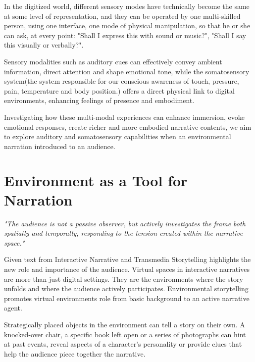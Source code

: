     In the digitized world, different sensory modes have technically become the same at some level of representation, and they can be operated by one multi-skilled person, using one interface, one mode of physical manipulation, so that he or she can ask, at every point: "Shall I express this with sound or music?", "Shall I say this visually or verbally?"\cite{Multimodal_Discourse}.\par

    Sensory modalities such as auditory cues can effectively convey ambient information, direct attention and shape emotional tone, while the somatosensory system(the system responsible for our conscious awareness of touch, pressure, pain, temperature and body position\cite{Somatic_Sensory}.) offers a direct physical link to digital environments, enhancing feelings of presence and embodiment.\par

    Investigating how these multi-modal experiences can enhance immersion, evoke emotional responses, create richer and more embodied narrative contents, we aim to explore auditory and somatosensory capabilities when an environmental narration introduced to an audience.\par
    \section{Environment as a Tool for Narration} 
    \emph{"The audience is not a passive observer, but actively investigates the frame both spatially and temporally, responding to the tension created within the narrative space\cite{Transmedia_Storytelling}."}

    Given text from Interactive Narrative and Transmedia Storytelling highlights the new role and importance of the audience. Virtual spaces in interactive narratives are more than just digital settings. They are the environments where the story unfolds and where the audience actively participates. Environmental storytelling promotes virtual environments role from basic background to an active narrative agent.\par

    Strategically placed objects in the environment can tell a story on their own. A knocked-over chair, a specific book left open or a series of photographs can hint at past events, reveal aspects of a character's personality or provide clues that help the audience piece together the narrative\cite{Environmental_Storytelling_Blogpost}.\par 

